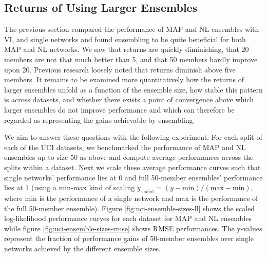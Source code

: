 \documentclass[../thesis.tex]{subfiles}
\begin{document}
\subsection*{Returns of Using Larger Ensembles}
The previous section compared the performance of MAP and NL ensembles with VI, and single networks and found ensembling to be quite beneficial for both MAP and NL networks. We saw that returns are quickly diminishing, that 20 members are not that much better than 5, and that 50 members hardly improve upon 20. Previous research loosely noted that returns diminish above five members. It remains to be examined more quantitatively how the returns of larger ensembles unfold as a function of the ensemble size, how stable this pattern is across datasets, and whether there exists a point of convergence above which larger ensembles do not improve performance and which can therefore be regarded as representing the gains achievable by ensembling.

We aim to answer these questions with the following experiment. For each split of each of the UCI datasets, we benchmarked the performance of MAP and NL ensembles up to size 50 as above and compute average performances across the splits within a dataset. Next we scale these average performance curves such that single networks' performance lies at 0 and full 50-member ensembles' performance lies at 1 (using a min-max kind of scaling $y_{\text{scaled}} = (y - \text{min}) / (\text{max} - \text{min})$, where min is the performance of a single network and max is the performance of the full 50-member ensemble). Figure \ref{fig:uci-ensemble-sizes-ll} shows the scaled log-likelihood performance curves for each dataset for MAP and NL ensembles while figure \ref{fig:uci-ensemble-sizes-rmse} shows RMSE performances. The y-values represent the fraction of performance gains of 50-member ensembles over single networks achieved by the different ensemble sizes. 
\end{document}
